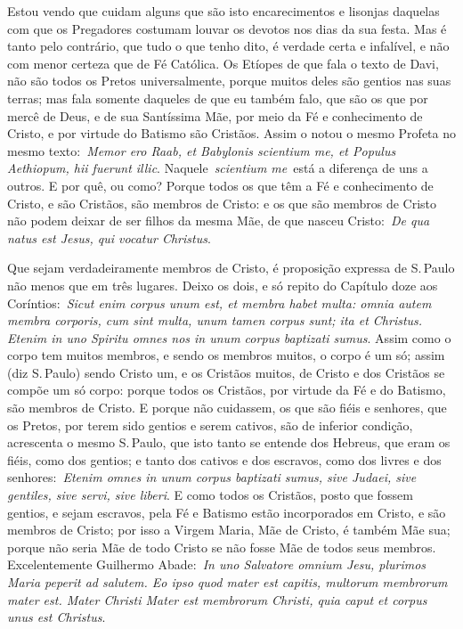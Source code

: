 Estou vendo que cuidam alguns que são isto encarecimentos e
lisonjas daquelas com que os Pregadores costumam louvar os devotos nos
dias da sua festa. Mas é tanto pelo contrário, que tudo o que tenho
dito, é verdade certa e infalível, e não com menor certeza que de Fé
Católica. Os Etíopes de que fala o texto de Davi, não são todos os
Pretos universalmente, porque muitos deles são gentios nas suas terras;
mas fala somente daqueles de que eu também falo, que são os que por
mercê de Deus, e de sua Santíssima Mãe, por meio da Fé e conhecimento de
Cristo, e por virtude do Batismo são Cristãos. Assim o notou o mesmo
Profeta no mesmo texto:~\emph{Memor ero Raab, et Babylonis scientium me,
et Populus Aethiopum, hii fuerunt illic}. Naquele~\emph{scientium
me}~está a diferença de uns a outros. E por quê, ou como? Porque todos
os que têm a Fé e conhecimento de Cristo, e são Cristãos, são membros de
Cristo: e os que são membros de Cristo não podem deixar de ser filhos da
mesma Mãe, de que nasceu Cristo:~\emph{De qua natus est Jesus, qui
vocatur Christus}.

Que sejam verdadeiramente membros de Cristo, é proposição
expressa de S.\,Paulo não menos que em três lugares. Deixo os dois, e só
repito do Capítulo doze aos Coríntios:~\emph{Sicut enim corpus unum est,
et membra habet multa: omnia autem membra corporis, cum sint multa, unum
tamen corpus sunt; ita et Christus. Etenim in uno Spiritu omnes nos in
unum corpus baptizati sumus}. Assim como o corpo tem
muitos membros, e sendo os membros muitos, o corpo é um só; assim (diz
S.\,Paulo) sendo Cristo um, e os Cristãos muitos, de Cristo e dos
Cristãos se compõe um só corpo: porque todos os Cristãos, por virtude da
Fé e do Batismo, são membros de Cristo. E porque não cuidassem, os que
são fiéis e senhores, que os Pretos, por terem sido gentios e serem
cativos, são de inferior condição, acrescenta o mesmo S.\,Paulo, que isto
tanto se entende dos Hebreus, que eram os fiéis, como dos gentios; e
tanto dos cativos e dos escravos, como dos livres e dos
senhores:~\emph{Etenim omnes in unum corpus baptizati sumus, sive
Judaei, sive gentiles, sive servi, sive liberi}. E
como todos os Cristãos, posto que fossem gentios, e sejam escravos, pela
Fé e Batismo estão incorporados em Cristo, e são membros de Cristo; por
isso a Virgem Maria, Mãe de Cristo, é também Mãe sua; porque não seria
Mãe de todo Cristo se não fosse Mãe de todos seus membros.
Excelentemente Guilhermo Abade:~\emph{In uno Salvatore omnium Jesu,
plurimos Maria peperit ad salutem. Eo ipso quod mater est capitis,
multorum membrorum mater est. Mater Christi Mater est membrorum Christi,
quia caput et corpus unus est Christus}.

